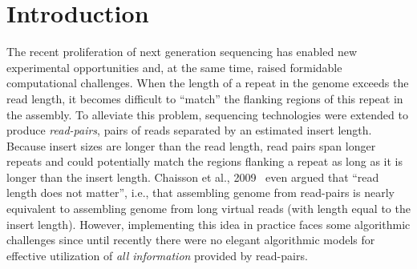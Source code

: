 \documentclass[a4paper]{article}
\begin{document}
\newpage
\section{Introduction}








The recent proliferation of next generation sequencing has enabled 
new experimental opportunities and, at the same time, 
raised formidable computational challenges. 
When the length of a repeat in the genome exceeds the read length, it becomes difficult to
 ``match'' the flanking regions of this repeat in the assembly.  To alleviate this
problem, sequencing technologies were extended to produce {\em read-pairs},  
pairs of reads separated by an estimated insert length. 
 Because insert sizes are longer than the read length, read
pairs span longer repeats and could potentially match the regions
flanking a repeat as long as it is longer than the insert length. Chaisson et al., 2009~\cite{Chaisson09} even 
argued that ``read length does not matter'', i.e., that assembling genome from read-pairs  
is nearly equivalent to assembling genome from long virtual reads (with length equal to the insert length).
However, implementing this idea in practice faces some algorithmic challenges since until recently there were 
no elegant algorithmic models for effective utilization of {\em all information} provided by read-pairs.  
\end{document}
